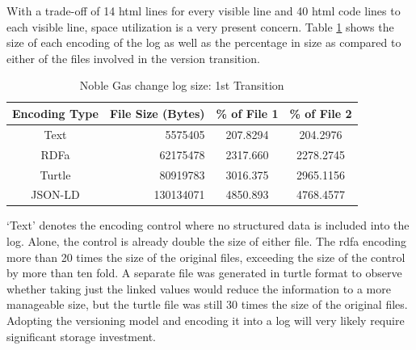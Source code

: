 With a trade-off of 14 \gls{html} lines for every visible line and 40 \gls{html} code lines to each visible line, space utilization is a very present concern.
Table \ref{table:Ng_changelog_table1} shows the size of each encoding of the \gls{log} as well as the percentage in size as compared to either of the files involved in the version transition.
\begin{table}
	\caption{Noble Gas change log size: 1st Transition}
	\label{table:Ng_changelog_table1}
	\centering
	\begin{tabular}{|c|r|c|c|}
		\hline
		Encoding Type & File Size (Bytes) & \% of File 1 & \% of File 2 \\
		\hline
		Text&	5575405&	207.8294&	204.2976\\
		RDFa&	62175478&	2317.660&	2278.2745\\
		Turtle&	80919783&	3016.375&	2965.1156\\
		JSON-LD&	130134071&	4850.893&	4768.4577\\
		\hline
	\end{tabular}
\end{table}
`Text' denotes the encoding control where no structured data is included into the \gls{log}.
Alone, the control is already double the size of either file.
The \gls{rdfa} encoding more than 20 times the size of the original files, exceeding the size of the control by more than ten fold.
A separate file was generated in turtle format to observe whether taking just the \gls{linked} values would reduce the information to a more manageable size, but the turtle file was still 30 times the size of the original files.
Adopting the versioning model and encoding it into a \gls{log} will very likely require significant storage investment.

